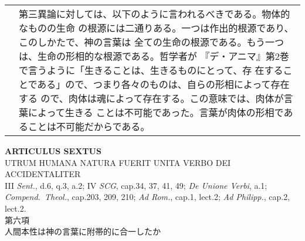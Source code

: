 \documentclass[10pt]{jsarticle} %
\begin{document}
\begin{longtable}{p{21em}p{21em}}
&

第三異論に対しては、以下のように言われるべきである。物体的なものの生命
の根源には二通りある。一つは作出的根源であり、このしかたで、神の言葉は
全ての生命の根源である。もう一つは、生命の形相的な根源である。哲学者が
『デ・アニマ』第2巻で言うように「生きることは、生きるものにとって、存
在することである」ので、つまり各々のものは、自らの形相によって存在する
ので、肉体は魂によって存在する。この意味では、肉体が言葉によって生きる
ことは不可能であった。言葉が肉体の形相であることは不可能だからである。


\end{longtable}
\newpage


\begin{center}
{\Large {\bf ARTICULUS SEXTUS}}\\ {\large UTRUM HUMANA NATURA FUERIT
UNITA VERBO DEI ACCIDENTALITER}\\ {\footnotesize III {\itshape Sent.},
d.6, q.3, a.2; IV {\itshape SCG}, cap.34, 37, 41, 49; {\itshape De
Unione Verbi}, a.1; {\itshape Compend.~Theol.}, cap.203, 209, 210;
{\itshape Ad Rom.}, cap.1, lect.2; {\itshape Ad Philipp.}, cap.2,
lect.2.}\\ {\Large 第六項\\人間本性は神の言葉に附帯的に合一したか}
\end{center}
\end{document}
